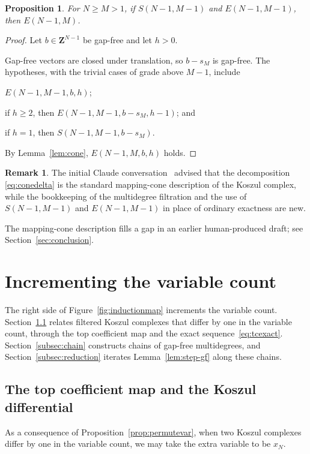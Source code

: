 \documentclass[12pt]{amsart}
\newtheorem{proposition}[theorem]{Proposition}
\theoremstyle{definition}
\newtheorem{remark1}[theorem]{Remark}
\theoremstyle{remark}
\newcommand{\Z}{\mathbf Z}
\begin{document}
\begin{proposition}\label{prop:cone}
  For $N \geq M > 1$, if $S(N-1, M-1)$ and $E(N-1,M-1)$, then $E(N-1, M)$.
\end{proposition}
\begin{proof}
Let $b \in \Z^{N-1}$ be gap-free and let $h > 0$.

Gap-free vectors are closed under translation, so $b - s_M$ is gap-free.
The hypotheses, with the trivial cases of grade above $M-1$, include
\begin{thmlist}
\item $E(N-1,M-1,b,h)$; 
\item if $h \geq 2$, then $E(N-1,M-1,b-s_M, h-1)$; and
\item if $h = 1$, then $S(N-1,M-1,b-s_M)$.
\end{thmlist}
By Lemma~\ref{lem:cone}, $E(N-1,M,b,h)$ holds.
\end{proof}

\begin{remark1}\label{rem:cone}
The initial Claude conversation~\cite{claude-sonnet-2026-koszul}
 advised that the decomposition \eqref{eq:conedelta}
  is the standard mapping-cone description of the Koszul complex,
  while
  the bookkeeping of the multidegree filtration
  and the use of $S(N-1, M-1)$ and $E(N-1,M-1)$ in place of ordinary exactness
  are new.

      The mapping-cone description fills a gap in an earlier human-produced draft;
   see Section~\ref{sec:conclusion}.
\end{remark1}


\section{Incrementing the variable count}\label{sec:variables}

The right side of Figure~\ref{fig:inductionmap} increments the variable count.
Section~\ref{subsec:topcoeff} relates filtered Koszul complexes that differ
by one in the variable count, through the top coefficient map and the
exact sequence~\eqref{eq:tcexact}.
Section~\ref{subsec:chain} constructs chains of gap-free multidegrees, and
Section~\ref{subsec:reduction} iterates Lemma~\ref{lem:step-gf} along these chains.

\subsection{The top coefficient map and the Koszul differential}\label{subsec:topcoeff}
As a consequence of Proposition~\ref{prop:permutevar}, when two Koszul
complexes differ by one in the variable count, we may take the extra
variable to be $x_N$.
\end{document}

